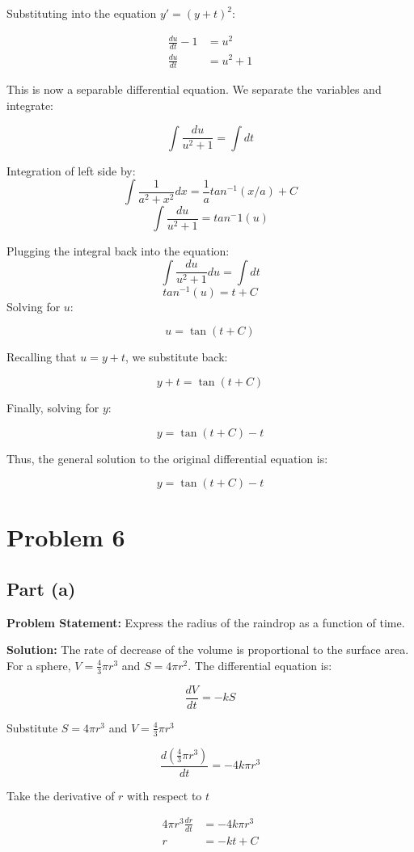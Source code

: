 \documentclass[12pt, letterpaper]{article}
\begin{document}
Substituting into the equation \( y' = (y + t)^2 \):

\begin{align*}
\frac{du}{dt} - 1 &= u^2 \\ 
\frac{du}{dt} &= u^2 + 1
\end{align*}

This is now a separable differential equation. We separate the variables and integrate:

\[
\int \frac{du}{u^2 + 1} = \int dt
\]

Integration of left side by:
\[
\int \frac{1}{a^2 + x^2} dx = \frac{1}{a}tan^{-1}(x/a) + C
\]
\[
\int \frac{du}{u^2 + 1}  = tan^-1(u)
\]

Plugging the integral back into the equation:
\[
\int \frac{du}{u^2 + 1} du = \int dt
\]
\[
tan^{-1}(u) = t + C
\]
Solving for \( u \):

\[
u = \tan(t + C)
\]

Recalling that \( u = y + t \), we substitute back:

\[
y + t = \tan(t + C)
\]

Finally, solving for \( y \):

\[
y = \tan(t + C) - t
\]

Thus, the general solution to the original differential equation is:

\[
y = \tan(t + C) - t
\]
\section*{Problem 6}

\subsection*{Part (a)}
\textbf{Problem Statement:} Express the radius of the raindrop as a function of time.

\textbf{Solution:}
The rate of decrease of the volume is proportional to the surface area. For a sphere, \( V = \frac{4}{3} \pi r^3 \) and \( S = 4 \pi r^2 \). The differential equation is:

\[
\frac{dV}{dt} = -k S
\]

Substitute $S = 4 \pi r^3$ and $V = \frac{4}{3}\pi r^3$

\[
\frac{d(\frac{4}{3}\pi r^3)}{dt} = -4k \pi r^3
\]

Take the derivative of $r$ with respect to $t$

\begin{align*}
4\pi r^3 \frac{dr}{dt} &= -4k \pi r^3\\
r &= -kt + C
\end{align*}
\end{document}
